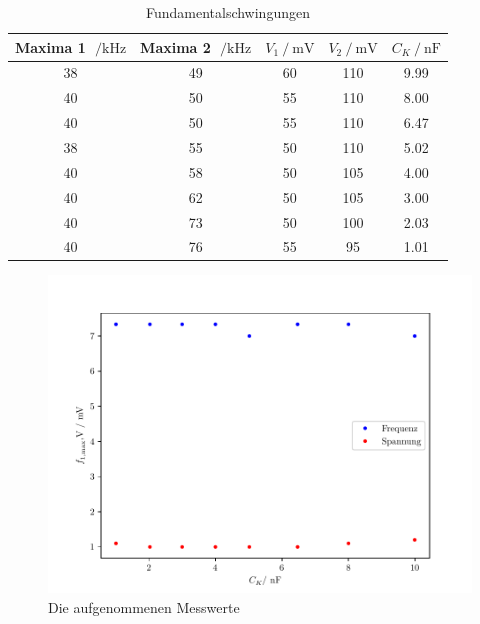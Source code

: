 \begin{table}
  \centering
  \caption{Fundamentalschwingungen}
  \label{tab:aufgabeC}
  \begin{tabular}{c c c c c}
      \toprule
      {Maxima 1 $\;/ \si{\kilo\hertz}$} & {Maxima 2 $\;/ \si{\kilo\hertz}$} & {$V_1 \:/\: \si{\milli\volt}$} & {$V_2 \:/\: \si{\milli\volt}$} & {$C_K \:/\: \si{\nano\farad}$} \\
      \midrule
      38 & 49 & 60 & 110 & 9.99 \\
      40 & 50 & 55 & 110 & 8.00 \\
      40 & 50 & 55 & 110 & 6.47 \\
      38 & 55 & 50 & 110 & 5.02 \\
      40 & 58 & 50 & 105 & 4.00 \\
      40 & 62 & 50 & 105 & 3.00 \\
      40 & 73 & 50 & 100 & 2.03 \\
      40 & 76 & 55 & 95 & 1.01 \\
      \bottomrule
  \end{tabular}
\end{table}


\begin{figure}
  \centering
  \includegraphics{freq1.pdf}
  \caption{Die aufgenommenen Messwerte}
  \label{fig:freq1}
\end{figure}

